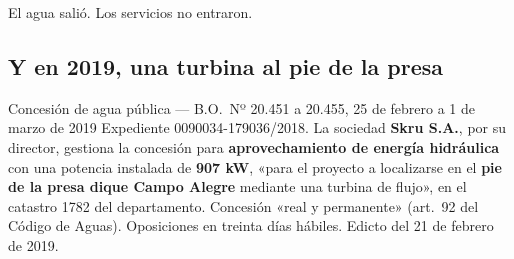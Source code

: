 El agua salió. Los servicios no entraron.

\subsection*{Y en 2019, una turbina al pie de la presa}

\begin{ficha}{Concesión de agua pública --- B.O.\ Nº 20.451 a 20.455, 25 de febrero a 1 de marzo de 2019}
Expediente 0090034-179036/2018. La sociedad \textbf{Skru S.A.}, por su director, gestiona la concesión para \textbf{aprovechamiento de energía hidráulica} con una potencia instalada de \textbf{907 kW}, «para el proyecto a localizarse en el \textbf{pie de la presa dique Campo Alegre} mediante una turbina de flujo», en el catastro 1782 del departamento. Concesión «real y permanente» (art.\ 92 del Código de Aguas). Oposiciones en treinta días hábiles. Edicto del 21 de febrero de 2019.
\end{ficha}

